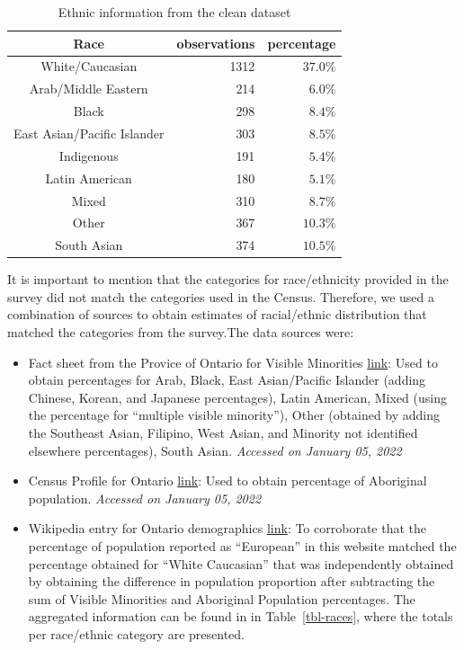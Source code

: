 \documentclass[
  letterpaper,
  DIV=11,
  numbers=noendperiod]{scrartcl}
\begin{document}
\begin{longtable}{crr}
\caption{Ethnic information from the clean dataset}\tabularnewline

\toprule
Race & observations & percentage \\ 
\midrule
White/Caucasian & 1312 & $37.0\%$ \\ 
Arab/Middle Eastern & 214 & $6.0\%$ \\ 
Black & 298 & $8.4\%$ \\ 
East Asian/Pacific Islander & 303 & $8.5\%$ \\ 
Indigenous & 191 & $5.4\%$ \\ 
Latin American & 180 & $5.1\%$ \\ 
Mixed & 310 & $8.7\%$ \\ 
Other & 367 & $10.3\%$ \\ 
South Asian & 374 & $10.5\%$ \\ 
\bottomrule
\end{longtable}

It is important to mention that the categories for race/ethnicity
provided in the survey did not match the categories used in the Census.
Therefore, we used a combination of sources to obtain estimates of
racial/ethnic distribution that matched the categories from the
survey.The data sources were:

\begin{itemize}
\item
  Fact sheet from the Provice of Ontario for Visible Minorities
  \href{https://www.ontario.ca/document/2016-census-highlights/fact-sheet-9-ethnic-origin-and-visible-minorities}{link}:
  Used to obtain percentages for Arab, Black, East Asian/Pacific
  Islander (adding Chinese, Korean, and Japanese percentages), Latin
  American, Mixed (using the percentage for ``multiple visible
  minority''), Other (obtained by adding the Southeast Asian, Filipino,
  West Asian, and Minority not identified elsewhere percentages), South
  Asian. \emph{Accessed on January 05, 2022}
\item
  Census Profile for Ontario
  \href{https://www12.statcan.gc.ca/census-recensement/2016/dp-pd/prof/details/page.cfm?Lang=E\&Geo1=PR\&Code1=35\&Geo2=PR\&Code2=01\&SearchText=Ontario\&SearchType=Begins\&SearchPR=01\&B1=Aboriginal\%20peoples\&TABID=1\&type=1}{link}:
  Used to obtain percentage of Aboriginal population. \emph{Accessed on
  January 05, 2022}
\item
  Wikipedia entry for Ontario demographics
  \href{https://en.wikipedia.org/wiki/Demographics_of_Ontario}{link}: To
  corroborate that the percentage of population reported as ``European''
  in this website matched the percentage obtained for ``White
  Caucasian'' that was independently obtained by obtaining the
  difference in population proportion after subtracting the sum of
  Visible Minorities and Aboriginal Population percentages. The
  aggregated information can be found in in Table~\ref{tbl-races}, where
  the totals per race/ethnic category are presented.
\end{itemize}
\end{document}
